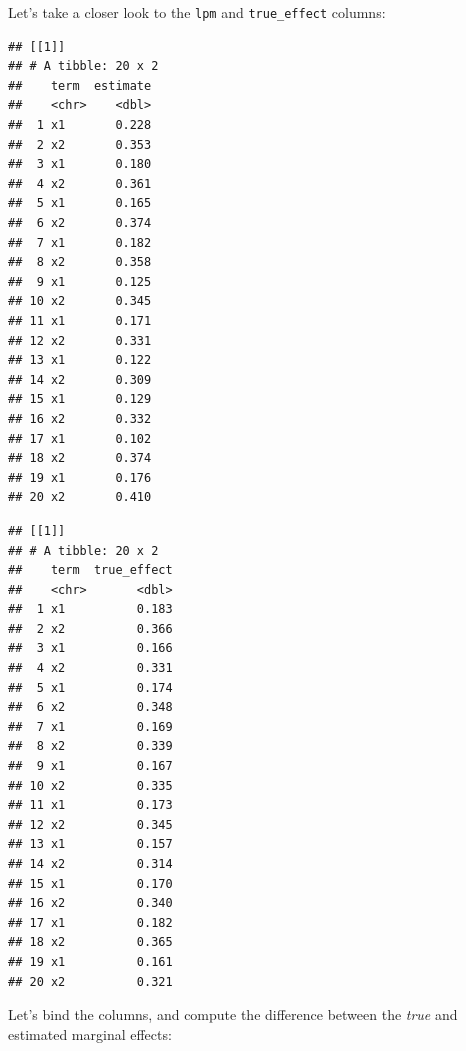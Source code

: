 \documentclass[
]{article}
\newenvironment{Shaded}{\begin{snugshade}}{\end{snugshade}}
\newcommand{\NormalTok}[1]{#1}
\newcommand{\SpecialCharTok}[1]{\textcolor[rgb]{0.00,0.00,0.00}{#1}}
\begin{document}
Let's take a closer look to the \texttt{lpm} and \texttt{true\_effect} columns:

\begin{Shaded}
\end{Shaded}

\begin{verbatim}
## [[1]]
## # A tibble: 20 x 2
##    term  estimate
##    <chr>    <dbl>
##  1 x1       0.228
##  2 x2       0.353
##  3 x1       0.180
##  4 x2       0.361
##  5 x1       0.165
##  6 x2       0.374
##  7 x1       0.182
##  8 x2       0.358
##  9 x1       0.125
## 10 x2       0.345
## 11 x1       0.171
## 12 x2       0.331
## 13 x1       0.122
## 14 x2       0.309
## 15 x1       0.129
## 16 x2       0.332
## 17 x1       0.102
## 18 x2       0.374
## 19 x1       0.176
## 20 x2       0.410
\end{verbatim}

\begin{Shaded}
\end{Shaded}

\begin{verbatim}
## [[1]]
## # A tibble: 20 x 2
##    term  true_effect
##    <chr>       <dbl>
##  1 x1          0.183
##  2 x2          0.366
##  3 x1          0.166
##  4 x2          0.331
##  5 x1          0.174
##  6 x2          0.348
##  7 x1          0.169
##  8 x2          0.339
##  9 x1          0.167
## 10 x2          0.335
## 11 x1          0.173
## 12 x2          0.345
## 13 x1          0.157
## 14 x2          0.314
## 15 x1          0.170
## 16 x2          0.340
## 17 x1          0.182
## 18 x2          0.365
## 19 x1          0.161
## 20 x2          0.321
\end{verbatim}

Let's bind the columns, and compute the difference between the \emph{true} and estimated marginal
effects:
\end{document}
